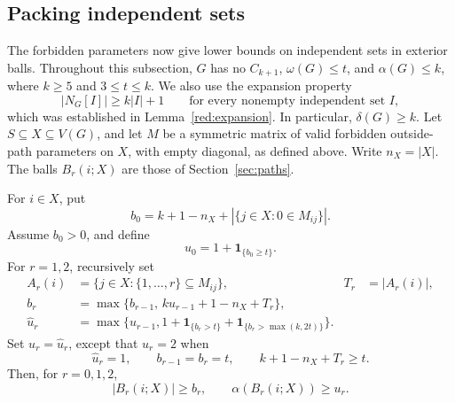 \subsection{Packing independent sets}\label{finite:packing-subsection}

The forbidden parameters now give lower bounds on independent sets in
exterior balls.  Throughout this subsection, $G$ has no $C_{k+1}$,
$\omega(G)\le t$, and $\alpha(G)\le k$, where $k\ge5$ and $3\le t\le k$.
We also use the expansion property
\[
 |N_G[I]|\ge k|I|+1
 \qquad\text{for every nonempty independent set }I,
\]
which was established in Lemma~\ref{red:expansion}.
In particular, $\delta(G)\ge k$.
Let $S\subseteq X\subseteq V(G)$, and let $M$ be a symmetric matrix of
valid forbidden outside-path parameters on $X$, with empty diagonal,
as defined above.  Write $n_X=|X|$.  The balls $B_r(i;X)$ are those of
Section~\ref{sec:paths}.

\begin{lemma}\label{finite:ball-bounds}
For $i\in X$, put
\[
 b_0=k+1-n_X+|\{j\in X:0\in M_{ij}\}|.
\]
Assume $b_0>0$, and define
\[
 u_0=1+\mathbf 1_{\{b_0\ge t\}}.
\]
For $r=1,2$, recursively set
\begin{align}
 A_r(i)&=\{j\in X:\{1,\ldots,r\}\subseteq M_{ij}\},
 &T_r&=|A_r(i)|,\label{finite:excluded-neighbors}\\
 b_r&=\max\{b_{r-1},\,ku_{r-1}+1-n_X+T_r\},\label{finite:ball-size}\\
 \widehat u_r&=\max\bigl\{u_{r-1},
       1+\mathbf 1_{\{b_r>t\}}
        +\mathbf 1_{\{b_r>\max(k,2t)\}}\bigr\}.
       \label{finite:ordinary-weight}
\end{align}
Set $u_r=\widehat u_r$, except that $u_r=2$ when
\begin{equation}\label{finite:exception-condition}
 \widehat u_r=1,\qquad b_{r-1}=b_r=t,\qquad
 k+1-n_X+T_r\ge t.
\end{equation}
Then, for $r=0,1,2$,
\[
 |B_r(i;X)|\ge b_r,\qquad \alpha(B_r(i;X))\ge u_r.
\]
\end{lemma}


